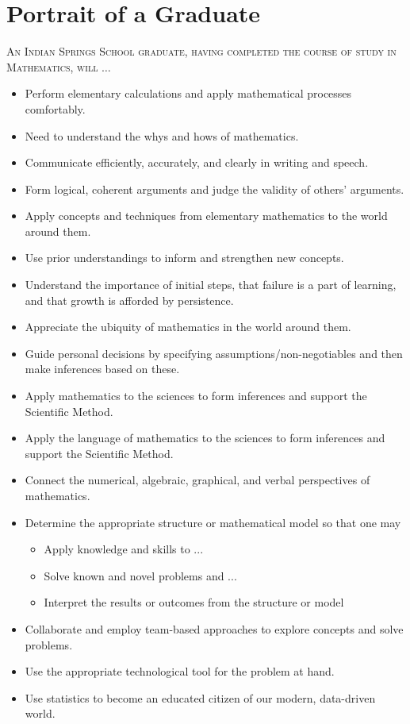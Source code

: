 \section{Portrait of a Graduate}

\textsc{An Indian Springs School graduate, having completed the course of study in Mathematics, will} $\ldots$ 

\begin{itemize}
\item Perform elementary calculations and apply mathematical processes comfortably.
\item Need to understand the whys and hows of mathematics.
\item Communicate efficiently, accurately, and clearly in writing and speech.
\item Form logical, coherent arguments and judge the validity of others’ arguments.
\item Apply concepts and techniques from elementary mathematics to the world around them.
\item Use prior understandings to inform and strengthen new concepts.
\item Understand the importance of initial steps, that failure is a part of learning, and that growth is afforded by persistence.
\item Appreciate the ubiquity of mathematics in the world around them.
\item Guide personal decisions by specifying assumptions/non-negotiables and then make inferences based on these.
\item Apply mathematics to the sciences to form inferences and support the Scientific Method.
\item Apply the language of mathematics to the sciences to form inferences and support the Scientific Method.
\item Connect the numerical, algebraic, graphical, and verbal perspectives of mathematics.
\item Determine the appropriate structure or mathematical model so that one may
\begin{itemize}
\item Apply knowledge and skills to ...
\item Solve known and novel problems and ...
\item Interpret the results or outcomes from the structure or model
\end{itemize}
\item Collaborate and employ team-based approaches to explore concepts and solve problems.
\item Use the appropriate technological tool for the problem at hand.
\item Use statistics to become an educated citizen of our modern, data-driven world.

\end{itemize}